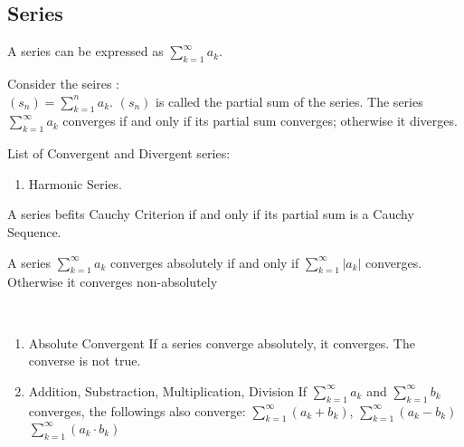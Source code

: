 \documentclass[../note.tex]{subfiles}
\begin{document}
\subsection{Series}
\begin{definition}[Series]
	A series can be expressed as $ \sum^{\infty}_{k=1} a_k$. 
\end{definition}
\begin{definition}
	Consider the seires :\\
	$(s_n)=\sum^{n}_{k=1} a_k$. $(s_n)$ is called the partial sum of the series. The series $\sum^{\infty}_{k=1}a_k $ converges if and only if its partial sum converges; otherwise it diverges. 
\end{definition}
\begin{example}
List of Convergent and Divergent series:
\begin{enumerate}
	\item Harmonic Series.
\end{enumerate}
\end{example}

\begin{definition}A series befits Cauchy Criterion if and only if its partial sum is a Cauchy Sequence. \end{definition}

\begin{definition} A series $\sum^{\infty}_{k=1}a_k$ converges absolutely if and only if $\sum^{\infty}_{k=1}|a_k|$ converges. Otherwise it converges non-absolutely
\end{definition}
\begin{theorem}\label{th:ConvergenceReveries}
\ 
\begin{enumerate}
	\item \label{th:ConvergenceReveries:en:absoluteconverge} Absolute Convergent
		If a series converge absolutely, it converges. The converse is not true. 
	\item Addition, Substraction, Multiplication, Division
		If $\sum^{\infty}_{k=1}a_k $ and $\sum^{\infty}_{k=1}b_k$ converges, the followings also converge:
		$\sum^{\infty}_{k=1}(a_k+b_k) $, $\sum^{\infty}_{k=1}(a_k-b_k) $ $\sum^{\infty}_{k=1}(a_k\cdot b_k)$
\end{enumerate}
\end{theorem}

\end{document}
